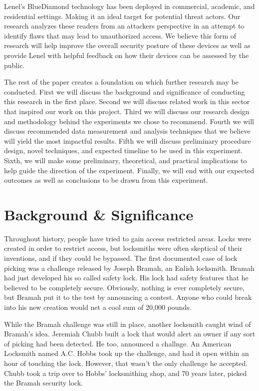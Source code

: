 \documentclass[10pt,twocolumn,letterpaper]{article}
\begin{document}
Lenel's BlueDiamond technology has been deployed in commercial, academic, and residential settings. Making it an ideal target for potential threat actors. Our research analyzes these readers from an attackers perspective in an attempt to identify flaws that may lead to unauthorized access. We believe this form of research will help improve the overall security posture of these devices as well as provide Lenel with helpful feedback on how their devices can be assessed by the public.

The rest of the paper creates a foundation on which further research may be conducted. First we will discuss the background and significance of conducting this research in the first place. Second we will discuss related work in this sector that inspired our work on this project. Third we will discuss our research design and methodology behind the experiments we chose to recommend. Fourth we will discuss recommended data measurement and analysis techniques that we believe will yield the most impactful results. Fifth we will discuss preliminary procedure design, novel techniques, and expected timeline to be used in this experiment. Sixth, we will make some preliminary, theoretical, and practical implications to help guide the direction of the experiment. Finally, we will end with our expected outcomes as well as conclusions to be drawn from this experiment.

\section{Background \& Significance}
Throughout history, people have tried to gain access restricted areas. \cite{lockpickinghistory}  Locks were created in order to restrict access, but locksmiths were often skeptical of their inventions, and if they could be bypassed.  The first documented case of lock picking was a challenge released by Joseph Bramah, an Enlish locksmith.  Bramah had just developed his so called safety lock.  His lock had safety features that he believed to be completely secure.  Obviously, nothing is ever completely secure, but Bramah put it to the test by announcing a contest.  Anyone who could break into his new creation would net a cool sum of 20,000 pounds.  

While the Bramah challenge was still in place, another locksmith caught wind of Bramah's idea.  Jeremiah Chubb built a lock that would alert an owner if any sort of picking had been detected.  He too, announced a challnge.  An American Locksmith named A.C. Hobbs took up the challenge, and had it open within an hour of touching the lock.  However, that wasn't the only challenge he accepted.  Chubb took a trip over to Hobbs' locksmithing shop, and 70 years later, picked the Bramah security lock.
\end{document}
